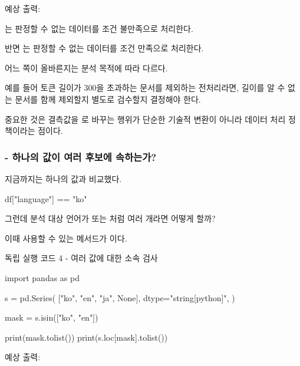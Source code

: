 예상 출력:

\begin{dhkzsh}
\end{dhkzsh}

는 판정할 수 없는 데이터를 조건 불만족으로 처리한다.

반면 는 판정할 수 없는 데이터를 조건 만족으로 처리한다.

어느 쪽이 올바른지는 분석 목적에 따라 다르다.

예를 들어 토큰 길이가 300을 초과하는 문서를 제외하는 전처리라면, 길이를 알 수 없는 문서를 함께 제외할지 별도로 검수할지 결정해야 한다.

중요한 것은 결측값을 로 바꾸는 행위가 단순한 기술적 변환이 아니라 데이터 처리 정책이라는 점이다.

\subsubsection{ - 하나의 값이 여러 후보에 속하는가?}

지금까지는 하나의 값과 비교했다.

\begin{dhkcode}
df["language"] == "ko"
\end{dhkcode}

그런데 분석 대상 언어가  또는 처럼 여러 개라면 어떻게 할까?

이때 사용할 수 있는 메서드가 이다.

\begin{dhknote}
\begin{dhksmry}[centered]
독립 실행 코드 4 - 여러 값에 대한 소속 검사
\end{dhksmry}
\end{dhknote}

\begin{dhkcode}
import pandas as pd

s = pd.Series(
    ["ko", "en", "ja", None],
    dtype="string[python]",
)

mask = s.isin(["ko", "en"])

print(mask.tolist())
print(s.loc[mask].tolist())
\end{dhkcode}

예상 출력:

\begin{dhkzsh}
\end{dhkzsh}


